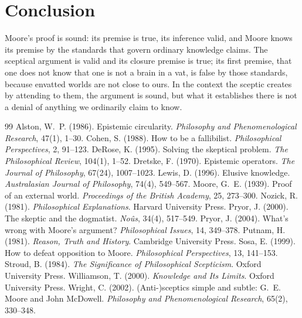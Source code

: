 \documentclass{situationist-preprint}
\begin{document}
\section{Conclusion}

Moore's proof is sound: its premise is true, its inference valid, and Moore knows its premise by the standards that govern ordinary knowledge claims. The sceptical argument is valid and its closure premise is true; its first premise, that one does not know that one is not a brain in a vat, is false by those standards, because envatted worlds are not close to ours. In the context the sceptic creates by attending to them, the argument is sound, but what it establishes there is not a denial of anything we ordinarily claim to know.

\begin{thebibliography}{99}\small
{} Alston, W.~P. (1986). Epistemic circularity. \emph{Philosophy and Phenomenological Research}, 47(1), 1--30.
 Cohen, S. (1988). How to be a fallibilist. \emph{Philosophical Perspectives}, 2, 91--123.
 DeRose, K. (1995). Solving the skeptical problem. \emph{The Philosophical Review}, 104(1), 1--52.
 Dretske, F. (1970). Epistemic operators. \emph{The Journal of Philosophy}, 67(24), 1007--1023.
 Lewis, D. (1996). Elusive knowledge. \emph{Australasian Journal of Philosophy}, 74(4), 549--567.
 Moore, G.~E. (1939). Proof of an external world. \emph{Proceedings of the British Academy}, 25, 273--300.
 Nozick, R. (1981). \emph{Philosophical Explanations}. Harvard University Press.
 Pryor, J. (2000). The skeptic and the dogmatist. \emph{No\^us}, 34(4), 517--549.
 Pryor, J. (2004). What's wrong with Moore's argument? \emph{Philosophical Issues}, 14, 349--378.
 Putnam, H. (1981). \emph{Reason, Truth and History}. Cambridge University Press.
 Sosa, E. (1999). How to defeat opposition to Moore. \emph{Philosophical Perspectives}, 13, 141--153.
 Stroud, B. (1984). \emph{The Significance of Philosophical Scepticism}. Oxford University Press.
 Williamson, T. (2000). \emph{Knowledge and Its Limits}. Oxford University Press.
 Wright, C. (2002). (Anti-)sceptics simple and subtle: G.~E. Moore and John McDowell. \emph{Philosophy and Phenomenological Research}, 65(2), 330--348.
\end{thebibliography}
\end{document}
